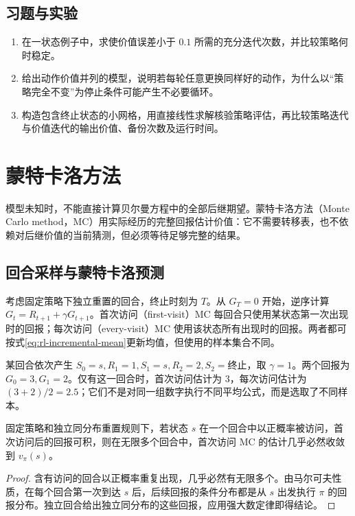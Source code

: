 \documentclass[UTF8,12pt,a4paper,fontset=fandol]{ctexbook}
\begin{document}
\section{习题与实验}
\begin{enumerate}
\item 在一状态例子中，求使价值误差小于 $0.1$ 所需的充分迭代次数，并比较策略何时稳定。
\item 给出动作价值并列的模型，说明若每轮任意更换同样好的动作，为什么以“策略完全不变”为停止条件可能产生不必要循环。
\item 构造包含终止状态的小网格，用直接线性求解核验策略评估，再比较策略迭代与价值迭代的输出价值、备份次数及运行时间。
\end{enumerate}

\chapter{蒙特卡洛方法}
\label{ch:rl-mc}

模型未知时，不能直接计算贝尔曼方程中的全部后继期望。蒙特卡洛方法（Monte Carlo method，MC）用实际经历的完整回报估计价值：它不需要转移表，也不依赖对后继价值的当前猜测，但必须等待足够完整的结果。

\section{回合采样与蒙特卡洛预测}

考虑固定策略下独立重置的回合，终止时刻为 $T$。从 $G_T=0$ 开始，逆序计算 $G_t=R_{t+1}+\gamma G_{t+1}$。首次访问（first-visit）MC 每回合只使用某状态第一次出现时的回报；每次访问（every-visit）MC 使用该状态所有出现时的回报。两者都可按式\eqref{eq:rl-incremental-mean}更新均值，但使用的样本集合不同。

\begin{example}[首次访问与每次访问]
某回合依次产生 $S_0=s,R_1=1,S_1=s,R_2=2,S_2=\text{终止}$，取 $\gamma=1$。两个回报为 $G_0=3,G_1=2$。仅有这一回合时，首次访问估计为 $3$，每次访问估计为 $(3+2)/2=2.5$；它们不是对同一组数字执行不同平均公式，而是选取了不同样本。
\end{example}

\begin{proposition}
固定策略和独立同分布重置规则下，若状态 $s$ 在一个回合中以正概率被访问，首次访问后的回报可积，则在无限多个回合中，首次访问 MC 的估计几乎必然收敛到 $v_\pi(s)$。
\end{proposition}
\begin{proof}
含有访问的回合以正概率重复出现，几乎必然有无限多个。由马尔可夫性质，在每个回合第一次到达 $s$ 后，后续回报的条件分布都是从 $s$ 出发执行 $\pi$ 的回报分布。独立回合给出独立同分布的这些回报，应用强大数定律即得结论。
\end{proof}
\end{document}
